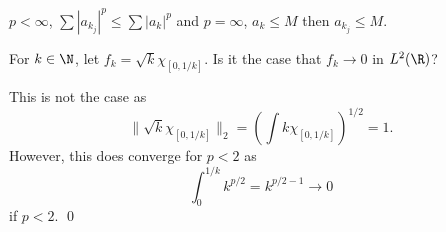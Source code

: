 \pf $p<\infty$, $\sum |a_{k_j}|^p \leq \sum |a_k|^p$ and $p=\infty$, $a_k \leq M$ then $a_{k_j} \leq M$.


\begin{quizsol}
For $k \in \N$, let $f_k= \sqrt{k} \chi_{[0,1/k]}$. Is it the case that $f_k \to 0$ in $L^2(\R)$?
\end{quizsol}

\pf This is not the case as 
	\[
	\| \sqrt{k} \chi_{[0,1/k]} \|_2= \left( \int k \chi_{[0,1/k]} \right)^{1/2}= 1.
	\]
However, this does converge for $p<2$ as
	\[
	\int_0^{1/k} k^{p/2}= k^{p/2-1} \to 0
	\]
if $p<2$. \qed \\

















